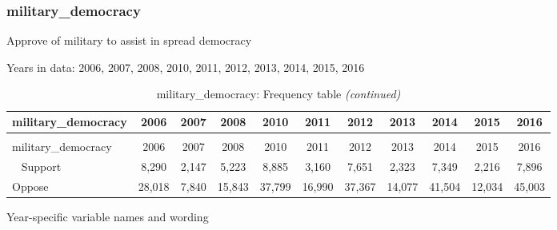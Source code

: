 \documentclass[12pt]{article}
\begin{document}
\subsubsection{military\_democracy}\label{military_democracy}

Approve of military to assist in spread democracy

Years in data: 2006, 2007, 2008, 2010, 2011, 2012, 2013, 2014, 2015,
2016

\begin{longtable}[t]{lcccccccccc}
\caption{\label{tab:unnamed-chunk-4}military\_democracy: Frequency table}\\
\toprule
military\_democracy & 2006 & 2007 & 2008 & 2010 & 2011 & 2012 & 2013 & 2014 & 2015 & 2016\\
\midrule
\endfirsthead
\caption[]{military\_democracy: Frequency table \textit{(continued)}}\\
\toprule
military\_democracy & 2006 & 2007 & 2008 & 2010 & 2011 & 2012 & 2013 & 2014 & 2015 & 2016\\
\midrule
\endhead
\
\endfoot
\bottomrule
\endlastfoot
Support & 8,290 & 2,147 & 5,223 & 8,885 & 3,160 & 7,651 & 2,323 & 7,349 & 2,216 & 7,896\\
Oppose & 28,018 & 7,840 & 15,843 & 37,799 & 16,990 & 37,367 & 14,077 & 41,504 & 12,034 & 45,003\\*
\end{longtable}

Year-specific variable names and wording
\end{document}
